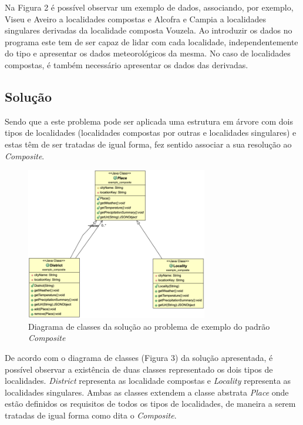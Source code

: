 \documentclass[10pt,portuguese]{article}
\begin{document}
\par Na Figura 2 é possível observar um exemplo de dados, associando, por exemplo, Viseu e Aveiro a localidades compostas e Alcofra e Campia a localidades singulares derivadas da localidade composta Vouzela. Ao introduzir os dados no programa este tem de ser capaz de lidar com cada localidade, independentemente do tipo e apresentar os dados meteorológicos da mesma. No caso de localidades compostas, é também necessário apresentar os dados das derivadas.

\clearpage

\subsection{Solução}

\par Sendo que a este problema pode ser aplicada uma estrutura em árvore com dois tipos de localidades (localidades compostas por outras e localidades singulares) e estas têm de ser tratadas de igual forma, fez sentido associar a sua resolução ao \textit{Composite}.

\begin{figure}[!h]
    \centering
    \includegraphics[width=300]{images/composite/UML_Example.png}
    \caption{Diagrama de classes da solução ao problema de exemplo do padrão \textit{Composite}}
\end{figure}

\par De acordo com o diagrama de classes (Figura 3) da solução apresentada, é possível observar a existência de duas classes representado os dois tipos de localidades. \textit{District} representa as localidade compostas e \textit{Locality} representa as localidades singulares. Ambas as classes extendem a classe abstrata \textit{Place} onde estão definidos os requisitos de todos os tipos de localidades, de maneira a serem tratadas de igual forma como dita o \textit{Composite}.
\end{document}
